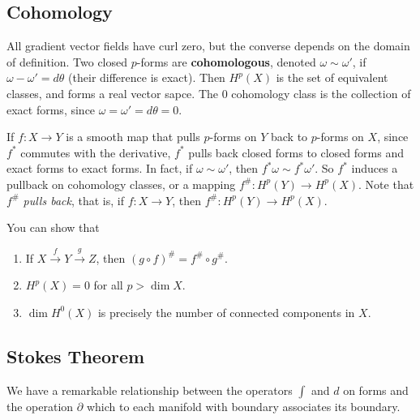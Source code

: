 \subsection{Cohomology}
All gradient vector fields have curl zero, but the converse depends on the domain of definition. Two closed $p$-forms are \textbf{cohomologous}, denoted $\omega \sim \omega'$, if $\omega-\omega'=d \theta$ (their difference is exact). Then $H^p(X)$ is the set of equivalent classes, and forms a real vector sapce. The 0 cohomology class is the collection of exact forms, since $\omega=\omega'=d \theta=0$.

If $f \colon X \to Y$ is a smooth map that pulls $p$-forms on $Y$ back to $p$-forms on $X$, since $f^*$ commutes with the derivative, $f^*$ pulls back closed forms to closed forms and exact forms to exact forms. In fact, if $\omega\sim \omega'$, then $f^* \omega\sim f^* \omega'$. So $f^*$ induces a pullback on cohomology classes, or a mapping $f^{\#} \colon H^p(Y) \to H^p(X)$. Note that $f^{\#}$ \emph{pulls back}, that is, if $f \colon X \to Y$, then $f^{\#}\colon H^p (Y) \to H^p(X)$.

You can show that
\begin{enumerate}
    \item If $X \overset{f}{\longrightarrow} Y \overset{g}{\longrightarrow} Z$, then $(g \circ f)^{\#}=f ^{\#}\circ g^{\#}$.
    \item $H^p(X)=0$ for all $p>\dim X$.
    \item $\dim H^0(X)$ is precisely the number of connected components in $X$.
\end{enumerate}

\subsection{Stokes Theorem}
We have a remarkable relationship between the operators $\int$ and $d$ on forms and the operation $\partial $ which to each manifold with boundary associates its boundary.

